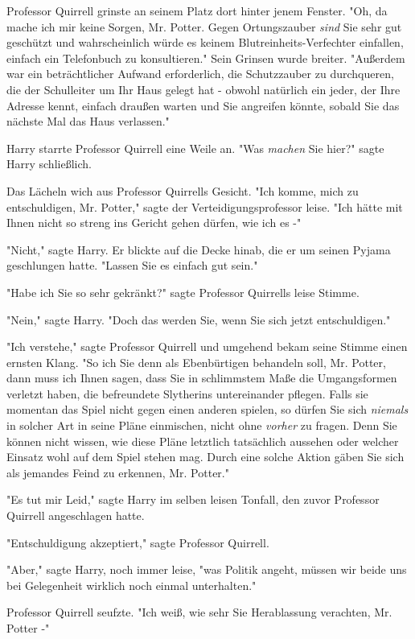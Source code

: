 {Professor Quirrell grinste an seinem Platz dort hinter jenem Fenster. "Oh, da mache ich mir keine Sorgen, Mr. Potter. Gegen Ortungszauber \emph{sind} Sie sehr gut geschützt und wahrscheinlich würde es keinem Blutreinheits-Verfechter einfallen, einfach ein Telefonbuch zu konsultieren." Sein Grinsen wurde breiter. "Außerdem war ein beträchtlicher Aufwand erforderlich, die Schutzzauber zu durchqueren, die der Schulleiter um Ihr Haus gelegt hat - obwohl natürlich ein jeder, der Ihre Adresse kennt, einfach draußen warten und Sie angreifen könnte, sobald Sie das nächste Mal das Haus verlassen."

Harry starrte Professor Quirrell eine Weile an. "Was \emph{machen} Sie hier?" sagte Harry schließlich.

Das Lächeln wich aus Professor Quirrells Gesicht. "Ich komme, mich zu entschuldigen, Mr. Potter," sagte der Verteidigungsprofessor leise. "Ich hätte mit Ihnen nicht so streng ins Gericht gehen dürfen, wie ich es -"

"Nicht," sagte Harry. Er blickte auf die Decke hinab, die er um seinen Pyjama geschlungen hatte. "Lassen Sie es einfach gut sein."

"Habe ich Sie so sehr gekränkt?" sagte Professor Quirrells leise Stimme.

"Nein," sagte Harry. "Doch das werden Sie, wenn Sie sich jetzt entschuldigen."

"Ich verstehe," sagte Professor Quirrell und umgehend bekam seine Stimme einen ernsten Klang. "So ich Sie denn als Ebenbürtigen behandeln soll, Mr. Potter, dann muss ich Ihnen sagen, dass Sie in schlimmstem Maße die Umgangsformen verletzt haben, die befreundete Slytherins untereinander pflegen. Falls sie momentan das Spiel nicht gegen einen anderen spielen, so dürfen Sie sich \emph{niemals} in solcher Art in seine Pläne einmischen, nicht ohne \emph{vorher} zu fragen. Denn Sie können nicht wissen, wie diese Pläne letztlich tatsächlich aussehen oder welcher Einsatz wohl auf dem Spiel stehen mag. Durch eine solche Aktion gäben Sie sich als jemandes Feind zu erkennen, Mr. Potter."

"Es tut mir Leid," sagte Harry im selben leisen Tonfall, den zuvor Professor Quirrell angeschlagen hatte.

"Entschuldigung akzeptiert," sagte Professor Quirrell.

"Aber," sagte Harry, noch immer leise, "was Politik angeht, müssen wir beide uns bei Gelegenheit wirklich noch einmal unterhalten."

Professor Quirrell seufzte. "Ich weiß, wie sehr Sie Herablassung verachten, Mr. Potter -"

}
